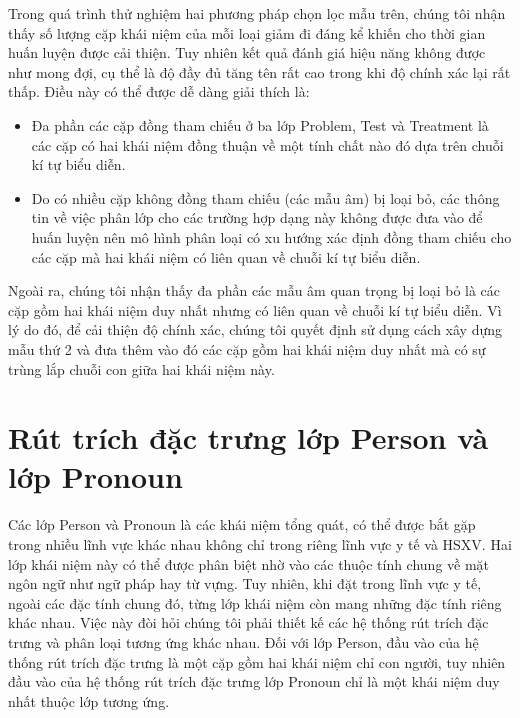 Trong quá trình thử nghiệm hai phương pháp chọn lọc mẫu trên, chúng tôi nhận thấy số lượng cặp khái niệm của mỗi loại giảm đi đáng kể khiến cho thời gian huấn luyện được cải thiện. Tuy nhiên kết quả đánh giá hiệu năng không được như mong đợi, cụ thể là độ đầy đủ tăng tên rất cao trong khi độ chính xác lại rất thấp. Điều này có thể được dễ dàng giải thích là:
\begin{itemize}
\item Đa phần các cặp đồng tham chiếu ở ba lớp Problem, Test và Treatment là các cặp có hai khái niệm đồng thuận về một tính chất nào đó dựa trên chuỗi kí tự biểu diễn.
\item Do có nhiều cặp không đồng tham chiếu (các mẫu âm) bị loại bỏ, các thông tin về việc phân lớp cho các trường hợp dạng này không được đưa vào để huấn luyện nên mô hình phân loại có xu hướng xác định đồng tham chiếu cho các cặp mà hai khái niệm có liên quan về chuỗi kí tự biểu diễn.
\end{itemize}

Ngoài ra, chúng tôi nhận thấy đa phần các mẫu âm quan trọng bị loại bỏ là các cặp gồm hai khái niệm duy nhất nhưng có liên quan về chuỗi kí tự biểu diễn. Vì lý do đó, để cải thiện độ chính xác, chúng tôi quyết định sử dụng cách xây dựng mẫu thứ 2 và đưa thêm vào đó các cặp gồm hai khái niệm duy nhất mà có sự trùng lắp chuỗi con giữa hai khái niệm này.

\section{Rút trích đặc trưng lớp Person và lớp Pronoun}
Các lớp Person và Pronoun là các khái niệm tổng quát, có thể được bắt gặp trong nhiều lĩnh vực khác nhau không chỉ trong riêng lĩnh vực y tế và HSXV. Hai lớp khái niệm này có thể được phân biệt nhờ vào các thuộc tính chung về mặt ngôn ngữ như ngữ pháp hay từ vựng. Tuy nhiên, khi đặt trong lĩnh vực y tế, ngoài các đặc tính chung đó, từng lớp khái niệm còn mang những đặc tính riêng khác nhau. Việc này đòi hỏi chúng tôi phải thiết kế các hệ thống rút trích đặc trưng và phân loại tương ứng khác nhau. Đối với lớp Person, đầu vào của hệ thống rút trích đặc trưng là một cặp gồm hai khái niệm chỉ con người, tuy nhiên đầu vào của hệ thống rút trích đặc trưng lớp Pronoun chỉ là một khái niệm duy nhất thuộc lớp tương ứng.

